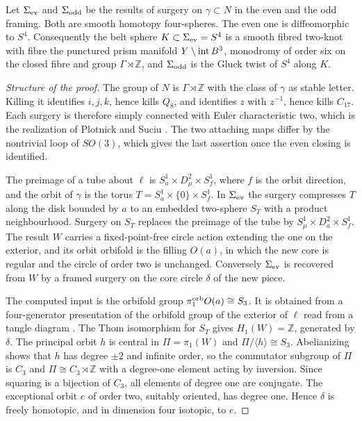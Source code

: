 \begin{proposition}\label{prop:even-prism}
Let \(\Sigma_{\rm ev}\) and \(\Sigma_{\rm odd}\) be the results of
surgery on \(\gamma\subset N\) in the even and the odd framing.
Both are smooth homotopy four-spheres. The even one is diffeomorphic to
\(S^4\). Consequently the belt sphere \(K\subset\Sigma_{\rm ev}=S^4\)
is a smooth fibred two-knot with fibre the punctured prism manifold
\(Y\setminus{\rm int}\,B^3\), monodromy of order six on the closed fibre
and group \(\Gamma\rtimes\mathbb Z\), and \(\Sigma_{\rm odd}\) is the
Gluck twist of \(S^4\) along \(K\).
\end{proposition}

\begin{proof}[Structure of the proof]
The group of \(N\) is \(\Gamma\rtimes\mathbb Z\) with the class of
\(\gamma\) as stable letter. Killing it identifies \(i,j,k\), hence
kills \(Q_8\), and identifies \(z\) with \(z^{-1}\), hence kills
\(C_{17}\). Each surgery is therefore simply connected with Euler
characteristic two, which is the realization of Plotnick and Suciu
\cite[Proposition 5.1]{PlotnickSuciu1987}. The two attaching maps
differ by the nontrivial loop of \(SO(3)\), which gives the last
assertion once the even closing is identified.

The preimage of a tube about \(\ell\) is
\(S^1_a\times D^2_\mu\times S^1_f\), where \(f\) is the orbit direction,
and the orbit of \(\gamma\) is the torus \(T=S^1_a\times\{0\}\times S^1_f\).
In \(\Sigma_{\rm ev}\) the surgery compresses \(T\) along the disk
bounded by \(a\) to an embedded two-sphere \(S_T\) with a product
neighbourhood. Surgery on \(S_T\) replaces the preimage of the tube by
\(S^1_\mu\times D^2_a\times S^1_f\). The result \(W\) carries a
fixed-point-free circle action extending the one on the exterior, and
its orbit orbifold is the filling \(O(a)\), in which the new core is
regular and the circle of order two is unchanged. Conversely
\(\Sigma_{\rm ev}\) is recovered from \(W\) by a framed surgery on the
core circle \(\delta\) of the new piece.

The computed input is the orbifold group
\(\pi_1^{\rm orb}O(a)\cong S_3\). It is obtained from a
four-generator presentation of the orbifold group of the exterior of
\(\ell\) read from a tangle diagram
\cite[TUBE, equivariant surgery]{Baker2026MarkedCutCalculations}.
The Thom isomorphism for \(S_T\) gives \(H_1(W)=\mathbb Z\), generated
by \(\delta\). The principal orbit \(h\) is central in
\(\Pi=\pi_1(W)\) and \(\Pi/\langle h\rangle\cong S_3\). Abelianizing
shows that \(h\) has degree \(\pm2\) and infinite order, so the
commutator subgroup of \(\Pi\) is \(C_3\) and
\(\Pi\cong C_3\rtimes\mathbb Z\) with a degree-one element acting by
inversion. Since squaring is a bijection of \(C_3\), all elements of
degree one are conjugate. The exceptional orbit \(e\) of order two,
suitably oriented, has degree one. Hence \(\delta\) is freely homotopic,
and in dimension four isotopic, to \(e\).


\end{proof}
